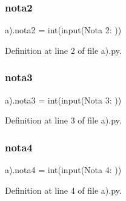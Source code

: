 \subsubsection{nota2}
{\footnotesize\ttfamily a).nota2 = int(input(\textquotesingle{}Nota 2\+: \textquotesingle{}))}



Definition at line 2 of file a).\+py.

\mbox{\label{namespacea_08_a017533439d80d267df75a7e4b028b164}} 
\subsubsection{nota3}
{\footnotesize\ttfamily a).nota3 = int(input(\textquotesingle{}Nota 3\+: \textquotesingle{}))}



Definition at line 3 of file a).\+py.

\mbox{\label{namespacea_08_a438eae050f1f91ec4e7885a1b1274660}} 
\subsubsection{nota4}
{\footnotesize\ttfamily a).nota4 = int(input(\textquotesingle{}Nota 4\+: \textquotesingle{}))}



Definition at line 4 of file a).\+py.

